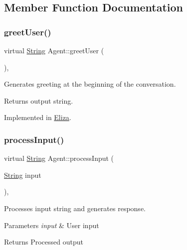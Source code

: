 \subsection{Member Function Documentation}
\mbox{\label{classAgent_a753289e615d0fbe962453695e41bd0b6}} 
\subsubsection{\texorpdfstring{greet\+User()}{greetUser()}}
{\footnotesize\ttfamily virtual \mbox{\hyperlink{classString}{String}} Agent\+::greet\+User (\begin{DoxyParamCaption}{ }\end{DoxyParamCaption})\hspace{0.3cm}{\ttfamily [protected]}, {}}

Generates greeting at the beginning of the conversation. \begin{DoxyReturn}{Returns}
output string. 
\end{DoxyReturn}


Implemented in \mbox{\hyperlink{classEliza_a87224cd89d0e0dafbc2e8883d1a83f14}{Eliza}}.

\mbox{\label{classAgent_a8908483f8d1302ec8dd65539369de9bb}} 
\subsubsection{\texorpdfstring{process\+Input()}{processInput()}}
{\footnotesize\ttfamily virtual \mbox{\hyperlink{classString}{String}} Agent\+::process\+Input (\begin{DoxyParamCaption}\item[{\mbox{\hyperlink{classString}{String}}}]{input }\end{DoxyParamCaption})\hspace{0.3cm}{\ttfamily [protected]}, {}}

Processes input string and generates response. 
\begin{DoxyParams}{Parameters}
{\em input} & User input \\
\hline
\end{DoxyParams}
\begin{DoxyReturn}{Returns}
Processed output 
\end{DoxyReturn}


